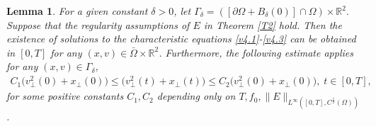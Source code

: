 \documentclass[11pt,reqno]{amsart}%
\newtheorem{Lemma}{Lemma}[section]
\theoremstyle{definition}
\theoremstyle{remark}
\begin{document}
\begin{Lemma}\label{L2}
For a given constant $\delta >0$, let $\Gamma_{\delta}=([\partial\Omega +B_{\delta}(0)]\cap \Omega)\times \mathbb{R}^{2}.$
Suppose that the regularity assumptions of $E$ in Theorem \ref{T2} hold. Then
the existence of solutions to the characteristic equations \eqref{v4.1}-\eqref{v4.3} can be obtained in $[0,T]$
for any $(x,v)\in \bar{\Omega}\times \mathbb{R}^{2}$.
Furthermore,    the following estimate applies  for any $(x, v) \in\Gamma_{\delta}$,
\begin{align}
C_{1}\Big(v^{2}_{\bot}(0)+x_{\bot}(0)\Big)\leq \Big(v^{2}_{\bot}(t)+x_{\bot}(t)\Big) \leq C_{2}\Big(v^{2}_{\bot}(0)+x_{\bot}(0)\Big), \; t\in[0,T],\label{v4.11}
\end{align}
for some   positive constants $C_{1}, C_{2}$ depending only on $T,f_{0},\|E\|_{L^{\infty}([0,T],C^{\frac{1}{2}}(\Omega))}$.
\end{Lemma}
\end{document}
